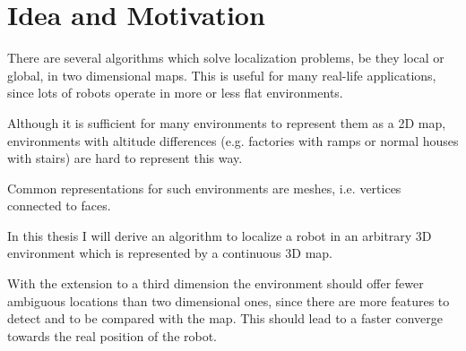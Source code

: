 \documentclass[../Thesis.tex]{subfiles}
\begin{document}
\chapter{Idea and Motivation}

There are several algorithms which solve localization problems, be they local or global, in two dimensional maps. This is useful for many real-life applications, since lots of robots operate in more or less flat environments.

Although it is sufficient for many environments to represent them as a 2D map, environments with altitude differences (e.g. factories with ramps or normal houses with stairs) are hard to represent this way. 


Common representations for such environments are meshes, i.e. vertices connected to faces. 


In this thesis I will derive an algorithm to localize a robot in an arbitrary 3D environment which is represented by a continuous 3D map. 

With the extension to a third dimension the environment should offer fewer ambiguous locations than two dimensional ones, since there are more features to detect and to be compared with the map. This should lead to a faster converge towards the real position of the robot.
\end{document}
